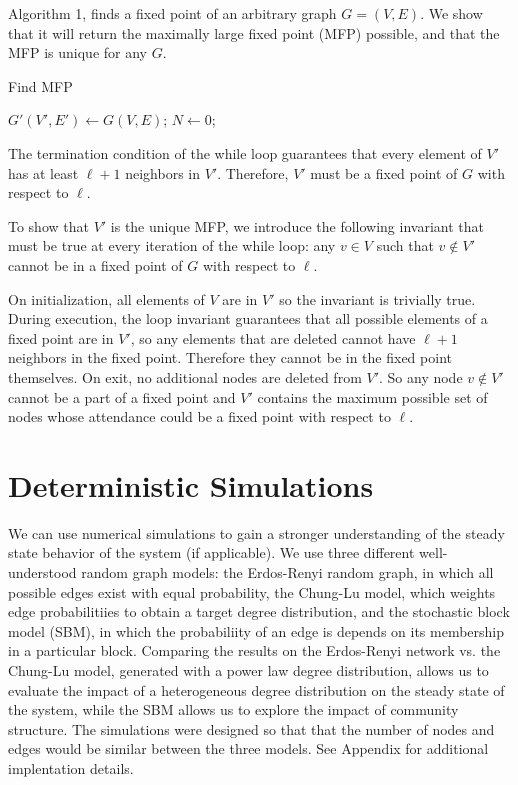 \documentclass[12pt]{article}
\begin{document}
Algorithm 1, finds a fixed point of an arbitrary graph $G=(V,E)$.  We show that it will return the maximally large fixed point (MFP) possible, and that the MFP is unique for any $G$.

\begin{algorithm}
  \caption{Find MFP}\label{alg:two}
  $G'(V', E') \gets G(V, E)$;
  $N \gets 0$;
  \end{algorithm}

  The termination condition of the while loop guarantees that every element of $V'$ has at least $\ell + 1$ neighbors in $V'$.  Therefore, $V'$ must be a fixed point of $G$ with respect to $\ell$.  
  
  To show that $V'$ is the unique MFP, we introduce the following invariant that must be true at every iteration of the while loop: any $v \in V$ such that $v \notin V'$ cannot be in a fixed point of $G$ with respect to $\ell$.

  On initialization, all elements of $V$ are in $V'$ so the invariant is trivially true.  During execution, the loop invariant guarantees that all possible elements of a fixed point are in $V'$, so any elements that are deleted cannot have $\ell + 1$ neighbors in the fixed point.  Therefore they cannot be in the fixed point themselves.  On exit, no additional nodes are deleted from $V'$.  So any node $v \notin V'$ cannot be a part of a fixed point and $V'$ contains the maximum possible set of nodes whose attendance could be a fixed point with respect to $\ell$. 

\section{Deterministic Simulations}
We can use numerical simulations to gain a stronger understanding of the steady state behavior of the system (if applicable).  We use three different well-understood random graph models: the Erdos-Renyi random graph, in which all possible edges exist with equal probability, the Chung-Lu model, which weights edge probabilitiies to obtain a target degree distribution, and the stochastic block model (SBM), in which the probabiliity of an edge is depends on its membership in a particular block.  Comparing the results on the Erdos-Renyi network vs. the Chung-Lu model, generated with a power law degree distribution, allows us to evaluate the impact of a heterogeneous degree distribution on the steady state of the system, while the SBM allows us to explore the impact of community structure.  The simulations were designed so that that the number of nodes and edges would be similar between the three models.  See Appendix for additional implentation details.
\end{document}

